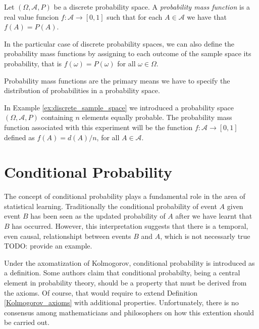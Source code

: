 \begin{definition}
\label{def:probability_function}
Let $\left( \Omega, \mathcal{A} , P \right)$ be a discrete probability space. A \emph{probability mass function} is a real value funcion $f : \mathcal{A} \rightarrow [0, 1]$ such that for each $A \in \mathcal{A}$ we have that $f \left( A \right) = P \left( A \right)$.
\end{definition}

In the particular case of discrete probability spaces, we can also define the probability mass functions by assigning to each outcome of the sample space its probability, that is $f \left( \omega \right) = P \left( \omega \right)$ for all $\omega \in \Omega$.

Probability mass functions are the primary means we have to specify the distribution of probabilities in a probability space.

\begin{example}
In Example \ref{ex:discrete_sample_space} we introduced a probability space $\left( \Omega, \mathcal{A}, P \right)$ containing $n$ elements equally probable. The probability mass function associated with this experiment will be the function $f : \mathcal{A} \rightarrow [0, 1]$ defined as $f \left( A \right) = d\left( A \right)/n$, for all $A \in \mathcal{A}$.
\end{example}


%
%

\section{Conditional Probability}
\label{sec:probability_conditional}

The concept of conditional probability plays a fundamental role in the area of statistical learning. Traditionally the conditional probability of event $A$ given event $B$ has been seen as the updated probability of $A$ after we have learnt that $B$ has occurred. However, this interpretation suggests that there is a temporal, even causal, relationshipt between events $B$ and $A$, which is not necessarly true {\color{red} TODO: provide an example}.

Under the axomatization of Kolmogorov, conditional probability is introduced as a definition. Some authors claim that conditional probabilty, being a central element in probability theory, should be a property that must be derived from the axioms. Of course, that would require to extend Definition \ref{Kolmogorov_axioms} with additional properties. Unfortunately, there is no consensus among mathematicians and philosophers on how this extention should be carried out.

